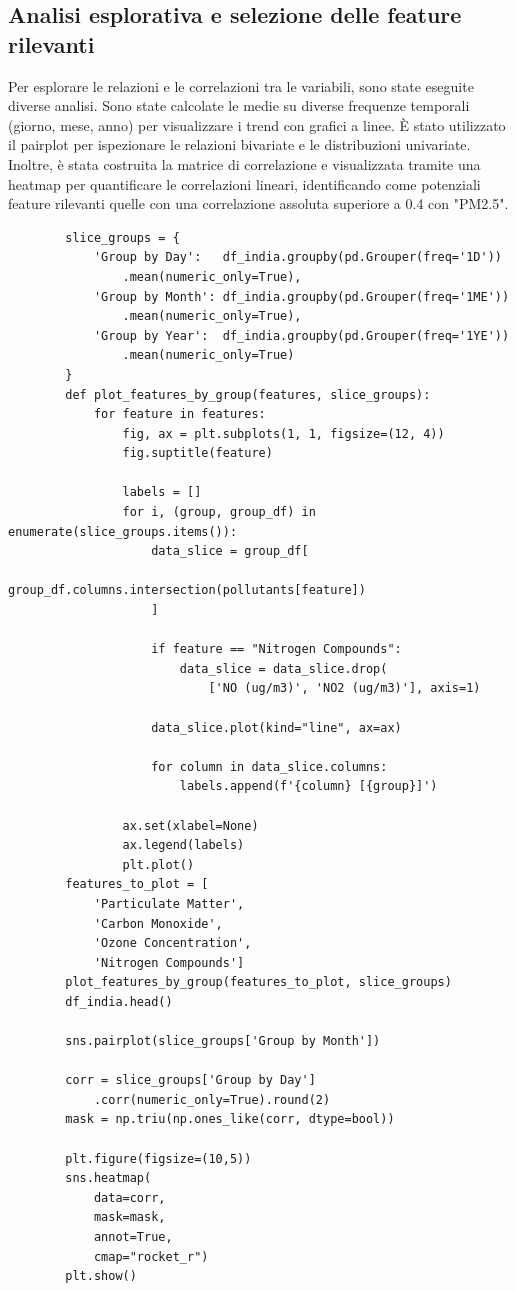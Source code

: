 \documentclass[a4paper,12pt]{report}
\begin{document}
	\subsection{Analisi esplorativa e selezione delle feature rilevanti}
	Per esplorare le relazioni e le correlazioni tra le variabili, sono state eseguite diverse analisi. Sono state calcolate le medie su diverse frequenze temporali (giorno, mese, anno) per visualizzare i trend con grafici a linee. È stato utilizzato il pairplot per ispezionare le relazioni bivariate e le distribuzioni univariate. Inoltre, è stata costruita la matrice di correlazione e visualizzata tramite una heatmap per quantificare le correlazioni lineari, identificando come potenziali feature rilevanti quelle con una correlazione assoluta superiore a 0.4 con "PM2.5".
	
	\begin{verbatim}
		slice_groups = {
			'Group by Day':   df_india.groupby(pd.Grouper(freq='1D'))
				.mean(numeric_only=True),
			'Group by Month': df_india.groupby(pd.Grouper(freq='1ME'))
				.mean(numeric_only=True),
			'Group by Year':  df_india.groupby(pd.Grouper(freq='1YE'))
				.mean(numeric_only=True)
		}
		def plot_features_by_group(features, slice_groups):
			for feature in features:
				fig, ax = plt.subplots(1, 1, figsize=(12, 4))
				fig.suptitle(feature)
				
				labels = []
				for i, (group, group_df) in enumerate(slice_groups.items()):
					data_slice = group_df[
						group_df.columns.intersection(pollutants[feature])
					]
					
					if feature == "Nitrogen Compounds":
						data_slice = data_slice.drop(
							['NO (ug/m3)', 'NO2 (ug/m3)'], axis=1)
					
					data_slice.plot(kind="line", ax=ax)
					
					for column in data_slice.columns:
						labels.append(f'{column} [{group}]')
				
				ax.set(xlabel=None)
				ax.legend(labels)
				plt.plot()
		features_to_plot = [
			'Particulate Matter', 
			'Carbon Monoxide', 
			'Ozone Concentration', 
			'Nitrogen Compounds']
		plot_features_by_group(features_to_plot, slice_groups)
		df_india.head()
		
		sns.pairplot(slice_groups['Group by Month'])
		
		corr = slice_groups['Group by Day']
			.corr(numeric_only=True).round(2)
		mask = np.triu(np.ones_like(corr, dtype=bool))
		
		plt.figure(figsize=(10,5))
		sns.heatmap(
			data=corr, 
			mask=mask, 
			annot=True, 
			cmap="rocket_r")
		plt.show()
	\end{verbatim}
	
\end{document}
